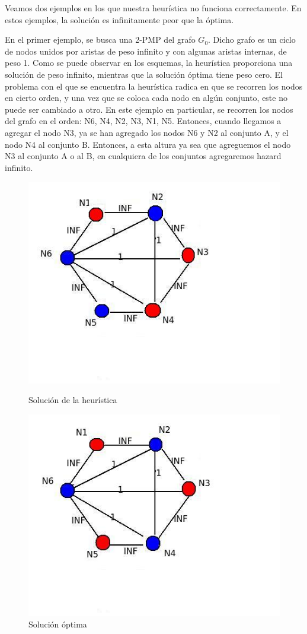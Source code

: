 \documentclass[11pt, a4paper, twoside]{article}
\begin{document}
\begin{enumerate}
		Veamos dos ejemplos en los que nuestra heurística no funciona correctamente. En estos ejemplos,
		la solución es infinitamente peor que la óptima.
		
		En el primer ejemplo, se busca una 2-PMP del grafo $G_{0}$. Dicho grafo es un ciclo de nodos unidos por aristas 
		de peso infinito y con algunas aristas internas, de peso 1. Como se puede observar en los esquemas,
		la heurística proporciona una solución de peso infinito, mientras que la solución óptima tiene peso cero.
		El problema con el que se encuentra la heurística radica en que se recorren los nodos en cierto orden, y
		una vez que se coloca cada nodo en algún conjunto, este no puede ser cambiado a otro. En este 
		ejemplo en particular, se recorren los nodos del grafo en el orden: N6, N4, N2, N3, N1, N5. Entonces,
		cuando llegamos a agregar el nodo N3, ya se han agregado los nodos N6 y N2 al conjunto A, y el nodo
		N4 al conjunto B. Entonces, a esta altura ya sea que  agreguemos el nodo N3 al conjunto A o al B, en 
		cualquiera de los conjuntos agregaremos hazard infinito.
		
		\begin{figure}[H]
			\begin{minipage}{.6\textwidth}
			\centering
			\includegraphics[width=.8\linewidth]{imagenes/ej3_11}
			\caption{Solución de la heurística}
			\end{minipage}
			\begin{minipage}{.6\textwidth}
			\includegraphics[width=.8\linewidth]{imagenes/ej3_12}
			\caption{Solución óptima}
			\end{minipage}
		\end{figure}
		

\end{enumerate}
\end{document}
